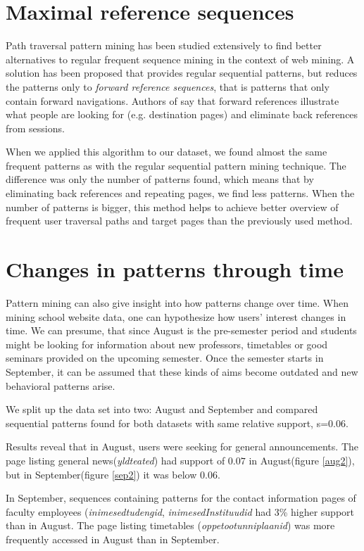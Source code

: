 \documentclass[12pt, english,a4paper]{article}
\begin{document}
\section{Maximal reference sequences}
Path traversal pattern mining has been studied extensively to find better alternatives to regular frequent sequence mining in the context of web mining. A solution has been proposed \cite{path_patterns} that provides regular sequential patterns, but reduces the patterns only to \emph{forward reference sequences}, that is patterns that only contain forward navigations. Authors of \cite{path_patterns} say that forward references illustrate what people are looking for (e.g. destination pages) and eliminate back references from sessions.

When we applied this algorithm to our dataset, we found almost the same frequent patterns as with the regular sequential pattern mining technique. The difference was only the number of patterns found, which means that by eliminating back references and repeating pages, we find less patterns. When the number of patterns is bigger, this method helps to achieve better overview of frequent user traversal paths and target pages than the previously used method.

\section{Changes in patterns through time} 
Pattern mining can also give insight into how patterns change over time. When mining school website data, one can hypothesize how users' interest changes in time. We can presume, that since August is the pre-semester period and students might be looking for information about new professors, timetables or good seminars provided on the upcoming semester. Once the semester starts in September, it can be assumed that these kinds of aims become outdated and new behavioral patterns arise.

We split up the data set into two: August and September and compared sequential patterns found for both datasets with same relative support, s=$0.06$.

Results reveal that in August, users were seeking for general announcements. The page listing general news(\emph{yldteated}) had support of $0.07$ in August(figure \ref{aug2}), but in September(figure \ref{sep2}) it was below $0.06$. 

In September, sequences containing patterns for the contact information pages of faculty employees (\emph{inimesedtudengid}, \emph{inimesedInstituudid} had 3\% higher support than in August. The page listing timetables (\emph{oppetootunniplaanid}) was more frequently accessed in August than in September.
\end{document}
